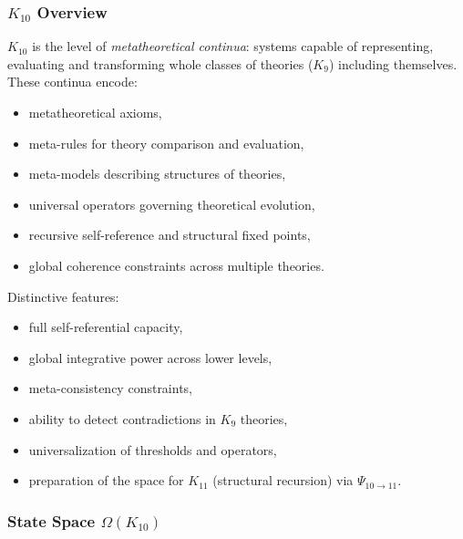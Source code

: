 

\subsubsection{$K_{10}$ Overview}
\label{sec:k10-overview}

$K_{10}$ is the level of \emph{metatheoretical continua}: systems capable of
representing, evaluating and transforming whole classes of theories ($K_9$)
including themselves. These continua encode:
\begin{itemize}
    \item metatheoretical axioms,
    \item meta-rules for theory comparison and evaluation,
    \item meta-models describing structures of theories,
    \item universal operators governing theoretical evolution,
    \item recursive self-reference and structural fixed points,
    \item global coherence constraints across multiple theories.
\end{itemize}

Distinctive features:
\begin{itemize}
    \item full self-referential capacity,
    \item global integrative power across lower levels,
    \item meta-consistency constraints,
    \item ability to detect contradictions in $K_9$ theories,
    \item universalization of thresholds and operators,
    \item preparation of the space for $K_{11}$ (structural recursion) via $\Psi_{10\to11}$.
\end{itemize}

\subsubsection{State Space $\Omega(K_{10})$}


